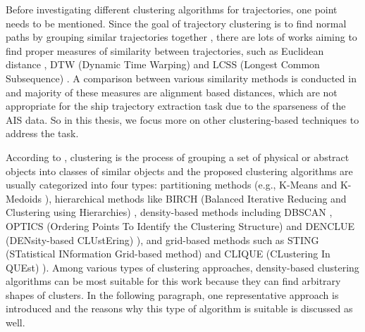 \documentclass[12pt,glossary]{dalcsthesis}
\begin{document}
Before investigating different clustering algorithms for trajectories, one point needs to be mentioned. %
Since the goal of trajectory clustering is to find normal paths  by grouping similar trajectories together \cite{Nicolas}, there are lots of works aiming to find proper measures of similarity between trajectories, such as Euclidean distance \cite{vehicle_clustering}, DTW (Dynamic Time Warping) \cite{dtw} and LCSS (Longest Common Subsequence) \cite{lcss}. A comparison between various similarity methods is conducted in \cite{comparison_distances} and majority of these measures are alignment based distances, which are not appropriate for the ship trajectory extraction task due to the sparseness of the AIS data. So in this thesis, we focus more on other clustering-based techniques to address the task.

According to \cite{hanjiaweibook}, clustering is the process of grouping a set of physical or abstract objects into classes of similar objects and the proposed clustering algorithms are usually categorized into four
types: partitioning methods (e.g., K-Means \cite{kmeans} and K-Medoids \cite{kmedoids}), hierarchical methods like BIRCH (Balanced Iterative Reducing and Clustering using Hierarchies) \cite{birch}, density-based methods including DBSCAN \cite{DBScan96}, OPTICS (Ordering Points To Identify the Clustering Structure) \cite{optics} and DENCLUE (DENsity-based
CLUstEring) \cite{denclue}), and grid-based methods such as STING (STatistical INformation Grid-based method) \cite{sting} and CLIQUE (CLustering In QUEst) \cite{clique}).  Among various types of clustering approaches, density-based clustering algorithms can be most suitable for this work because they can find arbitrary shapes of clusters.  In the following paragraph, one representative approach is introduced and the reasons why this type of algorithm is suitable is discussed as well.
\end{document}
